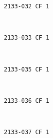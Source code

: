 \documentclass[11pt]{article}
\begin{document}
    \begin{Verbatim}[commandchars=\\\{\}]
2133-032 CF 1

    \end{Verbatim}

    \begin{center}
    \end{center}
    { \hspace*{\fill} \\}
    
    \begin{Verbatim}[commandchars=\\\{\}]
2133-033 CF 1

    \end{Verbatim}

    \begin{center}
    \end{center}
    { \hspace*{\fill} \\}
    
    \begin{Verbatim}[commandchars=\\\{\}]
2133-035 CF 1

    \end{Verbatim}

    \begin{center}
    \end{center}
    { \hspace*{\fill} \\}
    
    \begin{Verbatim}[commandchars=\\\{\}]
2133-036 CF 1

    \end{Verbatim}

    \begin{center}
    \end{center}
    { \hspace*{\fill} \\}
    
    \begin{Verbatim}[commandchars=\\\{\}]
2133-037 CF 1

    \end{Verbatim}
\end{document}
